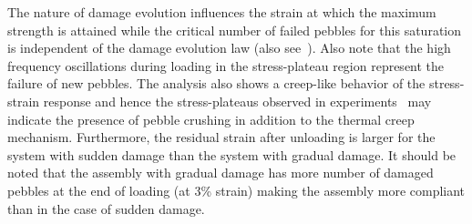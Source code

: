 The nature of damage evolution influences the strain at which the maximum strength is attained while the critical number of failed pebbles for this saturation is independent of the damage evolution law (also see~\cite{Zhao2010}). Also note that the high frequency oscillations during loading in the stress-plateau region represent the failure of new pebbles. The analysis also shows a creep-like behavior of the stress-strain response and hence the stress-plateaus observed in experiments~\cite{Reimann:2000tw} may indicate the presence of pebble crushing in addition to the thermal creep mechanism. Furthermore, the residual strain after unloading is larger for the system with sudden damage than the system with gradual damage. It should be noted that the assembly with gradual damage has more number of damaged pebbles at the end of loading (at 3\% strain) making the assembly more compliant than in the case of sudden damage. 









